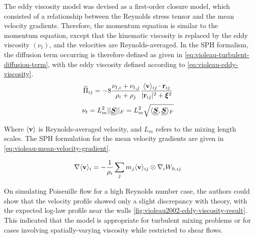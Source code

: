The eddy viscosity model was devised as a first-order closure model, which consisted of a relationship between the Reynolds stress tensor and the mean velocity gradients. Therefore, the momentum equation is similar to the momentum equation, except that the kinematic viscosity is replaced by the eddy viscosity $(\nu_t)$, and the velocities are Reynolds-averaged. In the SPH formalism, the diffusion term occurring is therefore defined as given in \ref{eq:violeau-turbulent-diffusion-term}, with the eddy viscosity defined according to \ref{eq:violeau-eddy-viscosity}.
\begin{equation}
	\widetilde{\Pi}_{ij} = -8 \frac{\nu_{t, i} + \nu_{t, j}}{\rho_i + \rho_j} \frac{\langle \mathbf{v} \rangle_{ij} \cdot \mathbf{r}_{ij} }{|\mathbf{r}_{ij}|^{2} + \bm{\xi}^2}
	\label{eq:violeau-turbulent-diffusion-term}
\end{equation}
\begin{equation}
	\nu_t = L_m^2 ||\underline{\underline{\bm{S}}}||_F = L_m^2 \sqrt{\langle \underline{\underline{\bm{S}}}, \underline{\underline{\bm{S}}} \rangle_F}
	\label{eq:violeau-eddy-viscosity}
\end{equation}

Where $\langle \mathbf{v} \rangle$ is Reynolds-averaged velocity, and $L_m$ refers to the mixing length scales. The SPH formulation for the mean velocity gradients are given in \ref{eq:violeau-mean-velocity-gradient}.

\begin{equation}
	\nabla \langle \mathbf{v} \rangle_i = - \frac{1}{\rho_i} \sum_j m_j \langle \mathbf{v} \rangle_{ij} \otimes \nabla_{i} W_{h, ij}
	\label{eq:violeau-mean-velocity-gradient}
\end{equation}

On simulating Poiseuille flow for a high Reynolds number case, the authors could show that the velocity profile showed only a slight discrepancy with theory, with the expected log-law profile near the walls \ref{fig:violeau2002-eddy-viscosity-result}. This indicated that the model is appropriate for turbulent mixing problems or for cases involving spatially-varying viscosity while restricted to shear flows.

